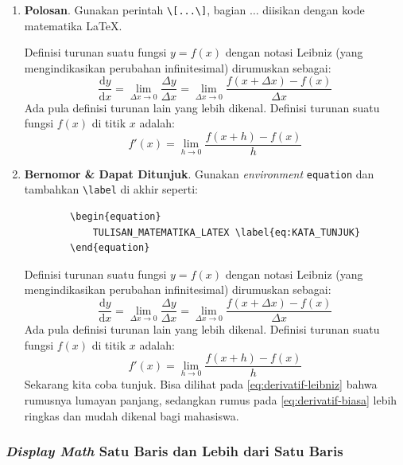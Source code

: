 \begin{enumerate}[label=\alph*.]
    \item \textbf{Polosan}. Gunakan perintah \verb|\[...\]|, bagian $\dots$ diisikan dengan kode matematika \LaTeX.
    
    Definisi turunan suatu fungsi $y = f(x)$ dengan notasi Leibniz (yang mengindikasikan perubahan infinitesimal) dirumuskan sebagai:
    \[\frac{\mathrm{d}y}{\mathrm{d}x} = \lim_{\Delta x \to 0} \frac{\Delta y}{\Delta x} = \lim_{\Delta x \to 0} \frac{f(x + \Delta x) - f(x)}{\Delta x}\]
    Ada pula definisi turunan lain yang lebih dikenal. Definisi turunan suatu fungsi $f(x)$ di titik $x$ adalah:
    \[f'(x) = \lim_{h \to 0} \frac{f(x+h) - f(x)}{h}\]
    
    \item \textbf{Bernomor \& Dapat Ditunjuk}. Gunakan \textit{environment} \texttt{equation} dan tambahkan \verb|\label| di akhir seperti:
    
    \begin{lstlisting}
        \begin{equation}
            TULISAN_MATEMATIKA_LATEX \label{eq:KATA_TUNJUK}
        \end{equation}    
    \end{lstlisting}
    
    Definisi turunan suatu fungsi $y = f(x)$ dengan notasi Leibniz (yang mengindikasikan perubahan infinitesimal) dirumuskan sebagai:
    \begin{equation}
        \frac{\mathrm{d}y}{\mathrm{d}x} = \lim_{\Delta x \to 0} \frac{\Delta y}{\Delta x} = \lim_{\Delta x \to 0} \frac{f(x + \Delta x) - f(x)}{\Delta x} \label{eq:derivatif-leibniz}
    \end{equation}
    Ada pula definisi turunan lain yang lebih dikenal. Definisi turunan suatu fungsi $f(x)$ di titik $x$ adalah:
    \begin{equation}
        f'(x) = \lim_{h \to 0} \frac{f(x+h) - f(x)}{h} \label{eq:derivatif-biasa}
    \end{equation}
    Sekarang kita coba tunjuk. Bisa dilihat pada \autoref{eq:derivatif-leibniz} bahwa rumusnya lumayan panjang, sedangkan rumus pada \autoref{eq:derivatif-biasa} lebih ringkas dan mudah dikenal bagi mahasiswa.
\end{enumerate}

\subsubsection{\textit{Display Math} Satu Baris dan Lebih dari Satu Baris}


